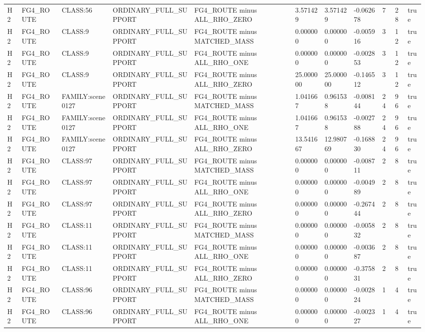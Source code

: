 \begin{tabular}{lllllllllll}
H2 & FG4\_ROUTE & CLASS:56 & ORDINARY\_FULL\_SUPPORT & FG4\_ROUTE minus ALL\_RHO\_ZERO & 3.571429 & 3.571429 & -0.062678 & 7 & 28 & true \\
H2 & FG4\_ROUTE & CLASS:9 & ORDINARY\_FULL\_SUPPORT & FG4\_ROUTE minus MATCHED\_MASS & 0.000000 & 0.000000 & -0.005916 & 3 & 12 & true \\
H2 & FG4\_ROUTE & CLASS:9 & ORDINARY\_FULL\_SUPPORT & FG4\_ROUTE minus ALL\_RHO\_ONE & 0.000000 & 0.000000 & -0.002853 & 3 & 12 & true \\
H2 & FG4\_ROUTE & CLASS:9 & ORDINARY\_FULL\_SUPPORT & FG4\_ROUTE minus ALL\_RHO\_ZERO & 25.000000 & 25.000000 & -0.146512 & 3 & 12 & true \\
H2 & FG4\_ROUTE & FAMILY:scene0127 & ORDINARY\_FULL\_SUPPORT & FG4\_ROUTE minus MATCHED\_MASS & 1.041667 & 0.961538 & -0.008144 & 24 & 96 & true \\
H2 & FG4\_ROUTE & FAMILY:scene0127 & ORDINARY\_FULL\_SUPPORT & FG4\_ROUTE minus ALL\_RHO\_ONE & 1.041667 & 0.961538 & -0.002788 & 24 & 96 & true \\
H2 & FG4\_ROUTE & FAMILY:scene0127 & ORDINARY\_FULL\_SUPPORT & FG4\_ROUTE minus ALL\_RHO\_ZERO & 13.541667 & 12.980769 & -0.168830 & 24 & 96 & true \\
H2 & FG4\_ROUTE & CLASS:97 & ORDINARY\_FULL\_SUPPORT & FG4\_ROUTE minus MATCHED\_MASS & 0.000000 & 0.000000 & -0.008711 & 2 & 8 & true \\
H2 & FG4\_ROUTE & CLASS:97 & ORDINARY\_FULL\_SUPPORT & FG4\_ROUTE minus ALL\_RHO\_ONE & 0.000000 & 0.000000 & -0.004989 & 2 & 8 & true \\
H2 & FG4\_ROUTE & CLASS:97 & ORDINARY\_FULL\_SUPPORT & FG4\_ROUTE minus ALL\_RHO\_ZERO & 0.000000 & 0.000000 & -0.267444 & 2 & 8 & true \\
H2 & FG4\_ROUTE & CLASS:11 & ORDINARY\_FULL\_SUPPORT & FG4\_ROUTE minus MATCHED\_MASS & 0.000000 & 0.000000 & -0.005832 & 2 & 8 & true \\
H2 & FG4\_ROUTE & CLASS:11 & ORDINARY\_FULL\_SUPPORT & FG4\_ROUTE minus ALL\_RHO\_ONE & 0.000000 & 0.000000 & -0.003687 & 2 & 8 & true \\
H2 & FG4\_ROUTE & CLASS:11 & ORDINARY\_FULL\_SUPPORT & FG4\_ROUTE minus ALL\_RHO\_ZERO & 0.000000 & 0.000000 & -0.375831 & 2 & 8 & true \\
H2 & FG4\_ROUTE & CLASS:96 & ORDINARY\_FULL\_SUPPORT & FG4\_ROUTE minus MATCHED\_MASS & 0.000000 & 0.000000 & -0.002824 & 1 & 4 & true \\
H2 & FG4\_ROUTE & CLASS:96 & ORDINARY\_FULL\_SUPPORT & FG4\_ROUTE minus ALL\_RHO\_ONE & 0.000000 & 0.000000 & -0.002327 & 1 & 4 & true \\

\end{tabular}
